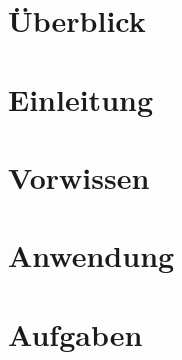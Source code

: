 \documentclass[]{beamer}
\begin{document}

\section{Überblick}


\section{Einleitung}




\section{Vorwissen}



\section{Anwendung}





\section{Aufgaben}

\end{document}
